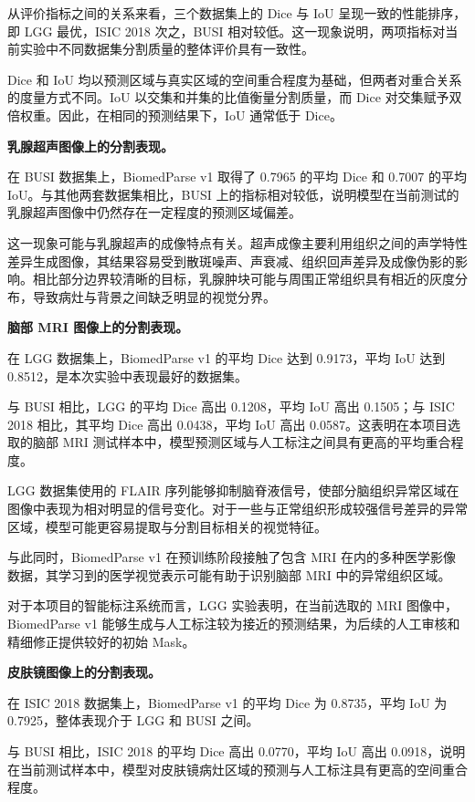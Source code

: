 \documentclass[10.5pt,compsoc]{CjC}
\theoremstyle{mystyle}
\begin{document}
从评价指标之间的关系来看，三个数据集上的 Dice 与 IoU 呈现一致的性能排序，即 LGG 最优，ISIC 2018 次之，BUSI 相对较低。这一现象说明，两项指标对当前实验中不同数据集分割质量的整体评价具有一致性。

Dice 和 IoU 均以预测区域与真实区域的空间重合程度为基础，但两者对重合关系的度量方式不同。IoU 以交集和并集的比值衡量分割质量，而 Dice 对交集赋予双倍权重。因此，在相同的预测结果下，IoU 通常低于 Dice。

\noindent\textbf{乳腺超声图像上的分割表现。}

在 BUSI 数据集上，BiomedParse v1 取得了 0.7965 的平均 Dice 和 0.7007 的平均 IoU。与其他两套数据集相比，BUSI 上的指标相对较低，说明模型在当前测试的乳腺超声图像中仍然存在一定程度的预测区域偏差。

这一现象可能与乳腺超声的成像特点有关。超声成像主要利用组织之间的声学特性差异生成图像，其结果容易受到散斑噪声、声衰减、组织回声差异及成像伪影的影响。相比部分边界较清晰的目标，乳腺肿块可能与周围正常组织具有相近的灰度分布，导致病灶与背景之间缺乏明显的视觉分界。


\noindent\textbf{脑部 MRI 图像上的分割表现。}

在 LGG 数据集上，BiomedParse v1 的平均 Dice 达到 0.9173，平均 IoU 达到 0.8512，是本次实验中表现最好的数据集。

与 BUSI 相比，LGG 的平均 Dice 高出 0.1208，平均 IoU 高出 0.1505；与 ISIC 2018 相比，其平均 Dice 高出 0.0438，平均 IoU 高出 0.0587。这表明在本项目选取的脑部 MRI 测试样本中，模型预测区域与人工标注之间具有更高的平均重合程度。

LGG 数据集使用的 FLAIR 序列能够抑制脑脊液信号，使部分脑组织异常区域在图像中表现为相对明显的信号变化。对于一些与正常组织形成较强信号差异的异常区域，模型可能更容易提取与分割目标相关的视觉特征。

与此同时，BiomedParse v1 在预训练阶段接触了包含 MRI 在内的多种医学影像数据，其学习到的医学视觉表示可能有助于识别脑部 MRI 中的异常组织区域。

对于本项目的智能标注系统而言，LGG 实验表明，在当前选取的 MRI 图像中，BiomedParse v1 能够生成与人工标注较为接近的预测结果，为后续的人工审核和精细修正提供较好的初始 Mask。

\noindent\textbf{皮肤镜图像上的分割表现。}

在 ISIC 2018 数据集上，BiomedParse v1 的平均 Dice 为 0.8735，平均 IoU 为 0.7925，整体表现介于 LGG 和 BUSI 之间。

与 BUSI 相比，ISIC 2018 的平均 Dice 高出 0.0770，平均 IoU 高出 0.0918，说明在当前测试样本中，模型对皮肤镜病灶区域的预测与人工标注具有更高的空间重合程度。
\end{document}
